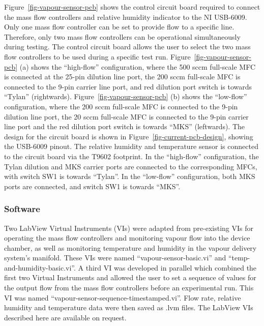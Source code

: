 \documentclass[
  a4paper,
]{scrbook}
\begin{document}
Figure~\ref{fig-vapour-sensor-pcb} shows the control circuit board
required to connect the mass flow controllers and relative humidity
indicator to the NI USB-6009. Only one mass flow controller can be set
to provide flow to a specific line. Therefore, only two mass flow
controllers can be operational simultaneously during testing. The
control circuit board allows the user to select the two mass flow
controllers to be used during a specific test run.
Figure~\ref{fig-vapour-sensor-pcb} (a) shows the ``high-flow''
configuration, where the 500 sccm full-scale MFC is connected at the
25-pin dilution line port, the 200 sccm full-scale MFC is connected to
the 9-pin carrier line port, and red dilution port switch is towards
``Tylan'' (rightwards). Figure~\ref{fig-vapour-sensor-pcb} (b) shows the
``low-flow'' configuration, where the 200 sccm full-scale MFC is
connected to the 9-pin dilution line port, the 20 sccm full-scale MFC is
connected to the 9-pin carrier line port and the red dilution port
switch is towards ``MKS'' (leftwards). The design for the circuit board
is shown in Figure~\ref{fig-current-pcb-design}, showing the USB-6009
pinout. The relative humidity and temperature sensor is connected to the
circuit board via the T9602 footprint. In the ``high-flow''
configuration, the Tylan dilution and MKS carrier ports are connected to
the corresponding MFCs, with switch SW1 is towards ``Tylan''. In the
``low-flow'' configuration, both MKS ports are connected, and switch SW1
is towards ``MKS''.

\hypertarget{software}{%
\subsubsection*{Software}\label{software}}

Two LabView Virtual Instruments (VIs) were adapted from pre-existing VIs
for operating the mass flow controllers and monitoring vapour flow into
the device chamber, as well as monitoring temperature and humidity in
the vapour delivery system's manifold. These VIs were named
``vapour-sensor-basic.vi'' and ``temp-and-humidity-basic.vi''. A third
VI was developed in parallel which combined the first two Virtual
Instruments and allowed the user to set a sequence of values for the
output flow from the mass flow controllers before an experimental run.
This VI was named ``vapour-sensor-sequence-timestamped.vi''. Flow rate,
relative humidity and temperature data were then saved as .lvm files.
The LabView VIs described here are available on request.
\end{document}
